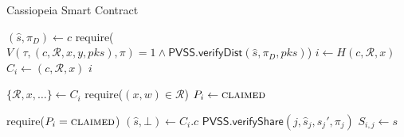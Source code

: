 \begin{algorithm}[H]
\caption{Cassiopeia Smart Contract}
\label{cassiopeia_no_incentives}
    \begin{algorithmic}[1]
            
            \EndFunction
            
                \State $(\hat{s}, \pi_D) \gets c$
                \State require($V(\tau, (c, \mathcal{R}, x, y, pks), \pi) = 1 \land \textsf{PVSS.verifyDist}(\hat{s}, \pi_D, pks)$)
                \State $i \gets H(c, \mathcal{R}, x)$
                \State $C_i \gets (c, \mathcal{R}, x)$
                \State \Return $i$
            \EndFunction
            
                \State $\{\mathcal{R}, x, \dots\} \gets C_i$
                \State require($(x, w) \in \mathcal{R}$)
                \State $P_i \gets \textsc{claimed}$
            \EndFunction
            
                \State require($P_i = \textsc{claimed}$)
                \State $(\hat{s}, \bot) \gets C_i.c$
                \State $\textsf{PVSS.verifyShare}(j, \hat{s}_j, s_j', \pi_j)$
                \State $S_{i,j} \gets s$
            \EndFunction
        \EndContract
    \end{algorithmic}
\end{algorithm}

